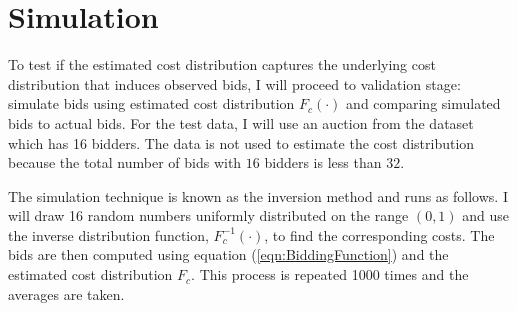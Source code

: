 \documentclass[11pt]{article}
\begin{document}
\section[title]{Simulation} 
To test if the estimated cost distribution captures the underlying cost 
distribution that induces observed bids, I will proceed to validation stage: 
simulate bids using estimated cost distribution 
$F_c(\cdot)$ and comparing simulated bids to actual bids. For the test data, 
I will use an auction from the dataset which has 16 bidders. The data is not used 
to estimate the cost distribution because the total number of bids with 
$16$ bidders is less than $32$. 

The simulation technique is known as the inversion method and runs as follows.
I will draw 16 random numbers uniformly 
distributed on the range $(0 ,1)$ and use the inverse distribution function, 
$F_c^{-1}(\cdot)$, to find the corresponding costs. The bids are then computed 
using equation (\ref{eqn:BiddingFunction}) and the estimated cost distribution 
$F_c$. This process is repeated 1000 times and the averages are taken. 
\end{document}

